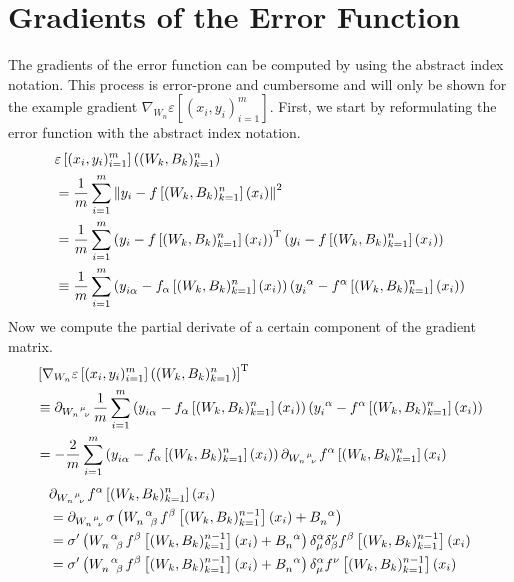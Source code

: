 \documentclass[a4paper,fleqn]{article}
\begin{document}
  \section*{Gradients of the Error Function}
    The gradients of the error function can be computed by using the abstract index notation.
    This process is error-prone and cumbersome and will only be shown for the example gradient $\nabla_{W_n}\varepsilon\left[(x_i,y_i)_{i=1}^m\right]$.
    First, we start by reformulating the error function with the abstract index notation.
    \begin{align*}
      &\varepsilon\left[(x_i,y_i)_{i=1}^m\right]\left((W_k,B_k)_{k=1}^n\right)\\
      &= \frac{1}{m}\sum_{i=1}^m \left\| y_i - f\left[(W_k,B_k)_{k=1}^n\right](x_i) \right\|^2 \\
      &= \frac{1}{m}\sum_{i=1}^m \left(
        y_i - f\left[(W_k,B_k)_{k=1}^n\right](x_i) \right)^\mathrm{T} \left( y_i - f\left[(W_k,B_k)_{k=1}^n\right](x_i)
      \right) \\
      &\equiv \frac{1}{m} \sum_{i=1}^m \left(y\indices{_i_\alpha} - f_\alpha\left[(W_k,B_k)_{k=1}^n\right](x_i)\right) \left(y\indices{_i^\alpha} - f^\alpha\left[(W_k,B_k)_{k=1}^n\right]\left(x_i\right)\right)
    \end{align*}
    Now we compute the partial derivate of a certain component of the gradient matrix.
    \begin{align*}
      &\left[ \nabla_{W_n}\varepsilon\left[(x_i,y_i)_{i=1}^m\right]\left((W_k,B_k)_{k=1}^n\right) \right]^\mathrm{T} \\
      &\equiv \partial_{W\indices{_n^\mu_\nu}} \frac{1}{m} \sum_{i=1}^m \left(y\indices{_i_\alpha} - f_\alpha\left[(W_k,B_k)_{k=1}^n\right](x_i)\right) \left(y\indices{_i^\alpha} - f^\alpha\left[(W_k,B_k)_{k=1}^n\right]\left(x_i\right)\right) \\
      &= -\frac{2}{m} \sum_{i=1}^m \left(y\indices{_i_\alpha} - f_\alpha\left[(W_k,B_k)_{k=1}^n\right](x_i)\right) \partial_{W\indices{_n^\mu_\nu}} f^\alpha\left[(W_k,B_k)_{k=1}^n\right]\left(x_i\right)
    \end{align*}
    \begin{align*}
      &\partial_{W\indices{_n^\mu_\nu}} f^\alpha\left[(W_k,B_k)_{k=1}^n\right]\left(x_i\right) \\
      &= \partial_{W\indices{_n^\mu_\nu}} \sigma\left(W\indices{_n^\alpha_\beta} f^\beta\left[(W_k,B_k)_{k=1}^{n-1}\right]\left(x_i\right) + B\indices{_n^\alpha} \right) \\
      &= \sigma'\left(W\indices{_n^\alpha_\beta} f^\beta\left[(W_k,B_k)_{k=1}^{n-1}\right]\left(x_i\right) + B\indices{_n^\alpha} \right) \delta_\mu^\alpha \delta_\beta^\nu f^\beta\left[(W_k,B_k)_{k=1}^{n-1}\right]\left(x_i\right) \\
      &= \sigma'\left(W\indices{_n^\alpha_\beta} f^\beta\left[(W_k,B_k)_{k=1}^{n-1}\right]\left(x_i\right) + B\indices{_n^\alpha} \right) \delta_\mu^\alpha f^\nu\left[(W_k,B_k)_{k=1}^{n-1}\right]\left(x_i\right)
    \end{align*}
\end{document}
